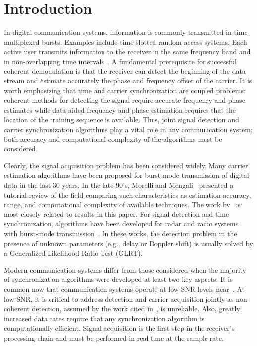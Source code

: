 \section{Introduction}
\label{sec:introduction}

In digital communication systems, information is commonly transmitted in time-multiplexed bursts.
Examples include time-slotted random access systems. Each active user transmits information to the receiver
in the same frequency band and in non-overlapping time intervals~\cite{Falconer_95}. 
A fundamental prerequisite for successful coherent demodulation is that the receiver can
detect the beginning of the data stream and estimate accurately the phase and frequency offset of the carrier.
It is worth emphasizing that time and carrier synchronization are coupled problems:
coherent methods for detecting the signal require accurate frequency and phase estimates while
data-aided frequency and phase estimation requires that the location of the training sequence is available.
Thus, joint signal detection and carrier synchronization algorithms play a vital role in any communication system;
both accuracy and computational complexity of the algorithms must be considered.

Clearly, the signal acquisition problem has been considered widely. 
Many carrier estimation algorithms have been proposed for burst-mode
transmission of digital data in the last 30 years.
In the late 90's, Morelli and Mengali~\cite{Morelli_Mengali_98} presented a tutorial review of the field
comparing such characteristics as estimation accuracy, range, and computational complexity of available techniques.
The work by~\cite{Rife_Boorstyn_74,Tretter_85,Kay_89,Luise_Reggiannini_95,Fitz_94,Mengali_Morelli_97} is most
closely related to results in this paper. 
For signal detection and time synchronization, algorithms have been developed for radar and radio
systems with burst-mode transmission~\cite{Kumari_15,Liu_Wei_15,Grossi_Lops_18, Bolisetti_11,Cui_Kong_09,Kumar_Dwivedi_16}.
In these works, the detection problem in the presence of unknown
parameters (e.g., delay or Doppler shift) is usually solved by a Generalized Likelihood Ratio Test (GLRT).

Modern communication systems differ from those considered when the majority of synchronization algorithms were 
developed at least two key aspects. 
It is common now that communication systems operate at low SNR levels near~\dB.
At low SNR, it is critical to address detection and carrier acquisition jointly as non-coherent detection, assumed
by the work cited in~\cite{Morelli_Mengali_98}, is unreliable.
Also, greatly increased data rates require that any synchronization algorithm is computationally efficient.
Signal acquisition is the first step in the receiver's processing chain and must be performed in real time at the sample rate.

